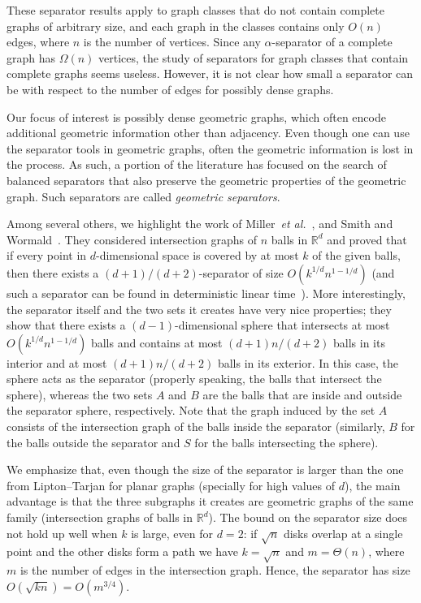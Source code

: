 \documentclass{llncs}
\newcommand{\etal}{\textit{et al.}}
\begin{document}
These separator results apply to graph classes that do not contain complete graphs of arbitrary size, and each graph in the classes contains only $O(n)$ edges,
where $n$ is the number of vertices.
Since any $\alpha$-separator of a complete graph has $\Omega(n)$ vertices, the study of separators for graph classes that contain complete graphs seems useless.
However, it is not clear how small a separator can be with respect to the number of edges for possibly dense graphs.

Our focus of interest is possibly dense geometric graphs, which often encode additional geometric information other than adjacency. Even though one can use the separator tools in geometric graphs, often the geometric information is lost in the process. As such, a portion of the literature has focused on the search of balanced separators that also preserve the geometric properties of the geometric graph. Such separators are called \emph{geometric separators}. 

Among several others, we highlight the work of
Miller~\etal~\cite{DBLP:journals/jacm/MillerTTV97}, and
Smith and Wormald~\cite{DBLP:conf/focs/SmithW98}. They considered intersection 
graphs of $n$ balls in $\mathbb{R}^d$
and proved that if every point in $d$-dimensional space is covered by at most $k$ of the given balls,
then there exists a $(d+1)/(d+2)$-separator of size $O(k^{1/d}n^{1-1/d})$ (and such a separator can be found in deterministic linear time~\cite{DBLP:journals/fuin/EppsteinMT95}). More interestingly, the separator itself and the two sets it creates have very nice properties; they show that there exists a $(d{-}1)$-dimensional sphere that intersects at most $O(k^{1/d}n^{1-1/d})$ balls and contains at most $(d+1)n/(d+2)$ balls in its interior and at most $(d+1)n/(d+2)$ balls in its exterior. In this case, the sphere acts as the separator (properly speaking, the balls that intersect the sphere), whereas the two sets $A$ and $B$ are the balls that are inside and outside the separator sphere, respectively. Note that the graph induced by the set $A$ consists of the intersection graph of the balls inside the separator (similarly, $B$ for the balls outside the separator and $S$ for the balls intersecting the sphere).

We emphasize that, even though the size of the separator is larger than the one from Lipton--Tarjan for planar graphs (specially for high values of $d$), the main advantage is that the three subgraphs it creates are geometric graphs of the same family (intersection graphs of balls in $\mathbb{R}^d$).
The bound on the separator size does not hold up well when $k$ is large, even for $d=2$: if $\sqrt{n}$ disks overlap at a single point and the other disks form a path we have $k=\sqrt{n}$ and $m=\Theta(n)$, where $m$ is the number of edges in the intersection graph. Hence, the separator has size $O(\sqrt{kn})=O(m^{3/4})$.
\end{document}
